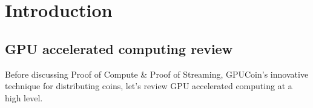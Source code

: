 \documentclass{article}
\begin{document}
\begin{abstract}
\fi

\end{abstract}
\newpage

\tableofcontents
\newpage

\section{Introduction}
\subsection{GPU accelerated computing review}
Before discussing Proof of Compute \& Proof of Streaming, GPUCoin's innovative technique for distributing coins, let’s review GPU accelerated computing at a high level.

\end{document}
